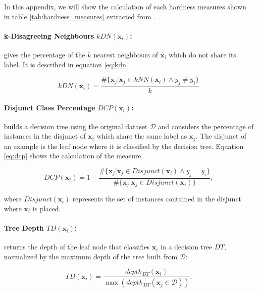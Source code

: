 In this appendix, we will show the calculation of each hardness measures shown in table \ref{tab:hardness_measures} extracted from \cite{Lorena2022}.

\paragraph*{k-Disagreeing Neighbours $kDN(\mathbf{x}_i)$:} gives the percentage of the $k$ nearest neighbours of $\mathbf{x}_i$ which do not share its label. It is described in equation \ref{eq:kdn}

\begin{equation} \label{eq:kdn}
	kDN(\mathbf{x}_i) = \frac{\# \{\mathbf{x}_j | \mathbf{x}_j \in kNN(\mathbf{x}_i) \wedge y_j \neq y_i \}}{k}
\end{equation}

\paragraph*{Disjunct Class Percentage $DCP(\mathbf{x}_i)$:} builds a decision tree using the original dataset $\mathcal{D}$ and considers the percentage of instances in the disjunct of $\mathbf{x}_i$ which share the same label as $\mathbf{x}_j$. The disjunct of an example is the leaf node where it is classified by the decision tree. Equation \ref{eq:dcp} shows the calculation of the measure.

\begin{equation} \label{eq:dcp}
	DCP(\mathbf{x}_i) = 1 - \frac{\# \{ \mathbf{x}_j | \mathbf{x}_j \in Disjunct(\mathbf{x}_i) \wedge y_j = y_i \}}{\# \{ \mathbf{x}_j | \mathbf{x}_j \in Disjunct(\mathbf{x}_i)\}},
\end{equation}

where $Disjunct(\mathbf{x}_i)$ represents the set of instances contained in the disjunct where $\mathbf{x}_i$ is placed.

\paragraph*{Tree Depth $TD(\mathbf{x}_i)$:} returns the depth of the leaf node that classifies $\mathbf{x}_i$ in a decision tree $DT$, normalized by the maximum depth of the tree built from $\mathcal{D}$:

\begin{equation}
	TD(\mathbf{x}_i) = \frac{depth_{DT}(\mathbf{x}_i)}{\max(depth_{DT}(\mathbf{x}_j \in \mathcal{D}))}.
\end{equation}

